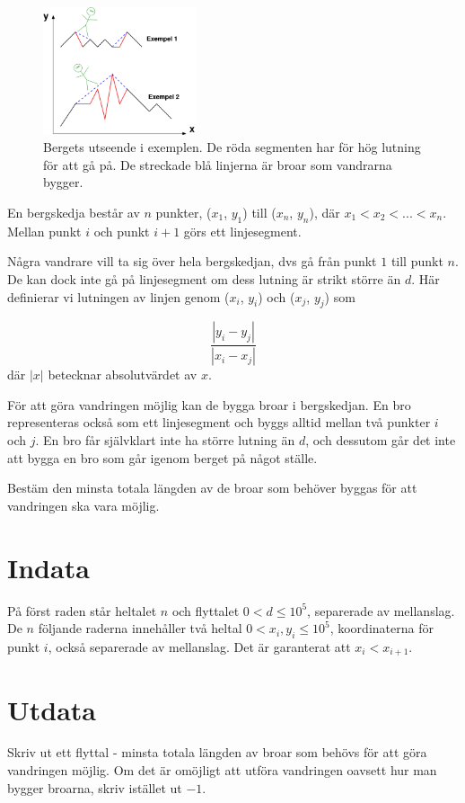 
\begin{figure}[ht!]
\centering
\includegraphics[width=0.4\textwidth]{berg.pdf}
\caption{Bergets utseende i exemplen. De röda segmenten har för hög lutning för att gå på. De streckade blå linjerna är broar som vandrarna bygger.}
\label{overflow}
\end{figure}

En bergskedja består av $n$ punkter, ($x_1$, $y_1$) till ($x_n$, $y_n$), där $x_1 < x_2 < ... < x_n$. Mellan punkt $i$ och punkt $i+1$ görs ett linjesegment.

Några vandrare vill ta sig över hela bergskedjan, dvs gå från punkt $1$ till punkt $n$. De kan dock inte gå på linjesegment om dess lutning är strikt större än $d$. Här definierar vi lutningen av linjen genom ($x_i$, $y_i$) och ($x_j$, $y_j$) som

$$
\frac{|y_i - y_j|}{|x_i - x_j|}
$$
där $|x|$ betecknar absolutvärdet av $x$.

För att göra vandringen möjlig kan de bygga broar i bergskedjan. En bro representeras också som ett linjesegment och byggs alltid mellan två punkter $i$ och $j$. En bro får självklart inte ha större lutning än $d$, och dessutom går det inte att bygga en bro som går igenom berget på något ställe.

Bestäm den minsta totala längden av de broar som behöver byggas för att vandringen ska vara möjlig.

\section*{Indata}
På först raden står heltalet $n$ och flyttalet $0 < d \le 10^5$, separerade av mellanslag.
De $n$ följande raderna innehåller två heltal $0 < x_i, y_i \le 10^5$, koordinaterna för punkt $i$, också separerade av mellanslag. Det är garanterat att $x_i < x_{i+1}$.

\section*{Utdata}
Skriv ut ett flyttal - minsta totala längden av broar som behövs för att göra vandringen möjlig.
Om det är omöjligt att utföra vandringen oavsett hur man bygger broarna, skriv istället ut $-1$.

